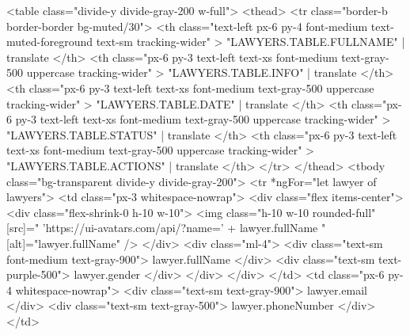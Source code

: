           <table class="divide-y divide-gray-200 w-full">
            <thead>
              <tr class="border-b border-border bg-muted/30">
                <th
                  class="text-left px-6 py-4 font-medium text-muted-foreground text-sm tracking-wider"
                >
                  {{ "LAWYERS.TABLE.FULLNAME" | translate }}
                </th>
                <th
                  class="px-6 py-3 text-left text-xs font-medium text-gray-500 uppercase tracking-wider"
                >
                  {{ "LAWYERS.TABLE.INFO" | translate }}
                </th>
                <th
                  class="px-6 py-3 text-left text-xs font-medium text-gray-500 uppercase tracking-wider"
                >
                  {{ "LAWYERS.TABLE.DATE" | translate }}
                </th>
                <th
                  class="px-6 py-3 text-left text-xs font-medium text-gray-500 uppercase tracking-wider"
                >
                  {{ "LAWYERS.TABLE.STATUS" | translate }}
                </th>
                <th
                  class="px-6 py-3 text-left text-xs font-medium text-gray-500 uppercase tracking-wider"
                >
                  {{ "LAWYERS.TABLE.ACTIONS" | translate }}
                </th>
              </tr>
            </thead>
            <tbody class="bg-transparent divide-y divide-gray-200">
              <tr *ngFor="let lawyer of lawyers">
                <td class="px-3 whitespace-nowrap">
                  <div class="flex items-center">
                    <div class="flex-shrink-0 h-10 w-10">
                      <img
                        class="h-10 w-10 rounded-full"
                        [src]="
                          'https://ui-avatars.com/api/?name=' + lawyer.fullName
                        "
                        [alt]="lawyer.fullName"
                      />
                    </div>
                    <div class="ml-4">
                      <div class="text-sm font-medium text-gray-900">
                        {{ lawyer.fullName }}
                      </div>
                      <div class="text-sm text-purple-500">
                        {{ lawyer.gender }}
                      </div>
                    </div>
                  </div>
                </td>
                <td class="px-6 py-4 whitespace-nowrap">
                  <div class="text-sm text-gray-900">
                    {{ lawyer.email }}
                  </div>
                  <div class="text-sm text-gray-500">
                    {{ lawyer.phoneNumber }}
                  </div>
                </td>
